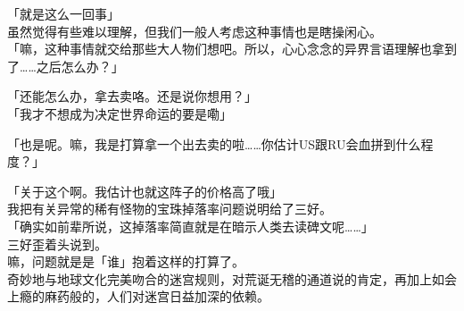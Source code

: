 「就是这么一回事」\\

虽然觉得有些难以理解，但我们一般人考虑这种事情也是瞎操闲心。\\

「嘛，这种事情就交给那些大人物们想吧。所以，心心念念的异界言语理解也拿到了……之后怎么办？」

「还能怎么办，拿去卖咯。还是说你想用？」\\

「我才不想成为决定世界命运的要是嘞」

「也是呢。嘛，我是打算拿一个出去卖的啦……你估计US跟RU会血拼到什么程度？」

「关于这个啊。我估计也就这阵子的价格高了哦」\\

我把有关异常的稀有怪物的宝珠掉落率问题说明给了三好。\\

「确实如前辈所说，这掉落率简直就是在暗示人类去读碑文呢……」\\

三好歪着头说到。\\

嘛，问题就是是「谁」抱着这样的打算了。\\

奇妙地与地球文化完美吻合的迷宫规则，对荒诞无稽的通道说的肯定，再加上如会上瘾的麻药般的，人们对迷宫日益加深的依赖。

